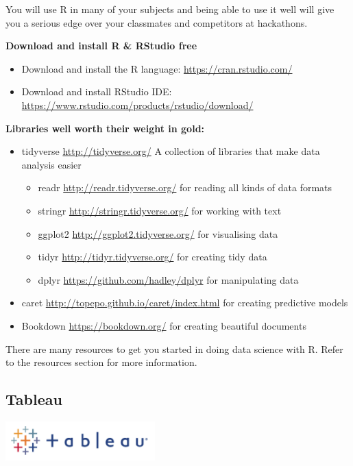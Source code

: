 \documentclass[]{book}
\providecommand{\tightlist}{%
  \setlength{\itemsep}{0pt}\setlength{\parskip}{0pt}}
\theoremstyle{definition}
\theoremstyle{definition}
\theoremstyle{remark}
\begin{document}
You will use R in many of your subjects and being able to use it well
will give you a serious edge over your classmates and competitors at
hackathons.

\textbf{Download and install R \& RStudio free}

\begin{itemize}
\tightlist
\item
  Download and install the R language: \url{https://cran.rstudio.com/}
\item
  Download and install RStudio IDE:
  \url{https://www.rstudio.com/products/rstudio/download/}
\end{itemize}

\textbf{Libraries well worth their weight in gold:}

\begin{itemize}
\tightlist
\item
  tidyverse \url{http://tidyverse.org/} A collection of libraries that
  make data analysis easier

  \begin{itemize}
  \tightlist
  \item
    readr \url{http://readr.tidyverse.org/} for reading all kinds of
    data formats
  \item
    stringr \url{http://stringr.tidyverse.org/} for working with text
  \item
    ggplot2 \url{http://ggplot2.tidyverse.org/} for visualising data
  \item
    tidyr \url{http://tidyr.tidyverse.org/} for creating tidy data
  \item
    dplyr \url{https://github.com/hadley/dplyr} for manipulating data
  \end{itemize}
\item
  caret \url{http://topepo.github.io/caret/index.html} for creating
  predictive models
\item
  Bookdown \url{https://bookdown.org/} for creating beautiful documents
\end{itemize}

There are many resources to get you started in doing data science with
R. Refer to the resources section for more information.

\subsection{Tableau}\label{tableau}

\includegraphics[width=0.3\linewidth]{images/Tableaulogo}
\end{document}
